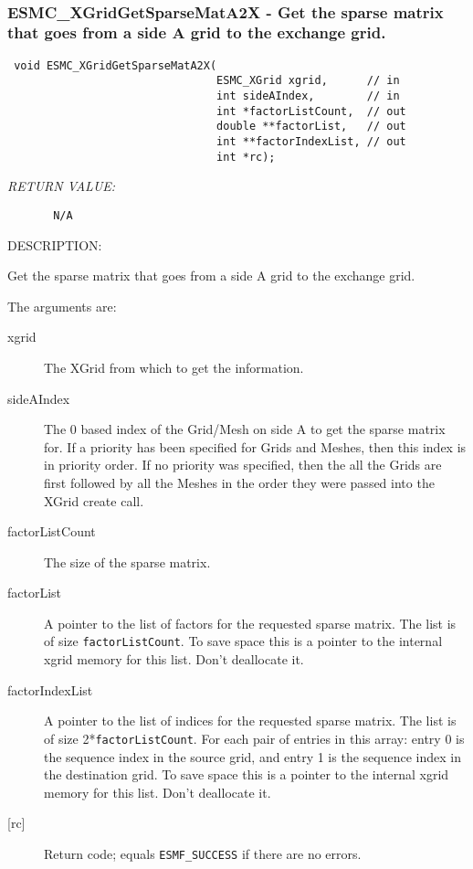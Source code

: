 \mbox{}\hrulefill\ 
 
\subsubsection [ESMC\_XGridGetSparseMatA2X] {ESMC\_XGridGetSparseMatA2X - Get the sparse matrix that goes from a side A grid to the exchange grid.}


 
  
\begin{verbatim} void ESMC_XGridGetSparseMatA2X(
                                ESMC_XGrid xgrid,      // in
                                int sideAIndex,        // in
                                int *factorListCount,  // out
                                double **factorList,   // out
                                int **factorIndexList, // out
                                int *rc);
 \end{verbatim}{\em RETURN VALUE:}
\begin{verbatim}       N/A\end{verbatim}
{\sf DESCRIPTION:\\ }


   
      Get the sparse matrix that goes from a side A grid to the exchange grid.
  
    The arguments are:
    \begin{description}
    \item[xgrid]
      The XGrid from which to get the information.
    \item[sideAIndex]
      The 0 based index of the Grid/Mesh on side A to get the sparse matrix for.
      If a priority has been specified for Grids and Meshes, then this index is 
      in priority order. If no priority was specified, then the all the Grids are
      first followed by all the Meshes in the order they were passed into the XGrid 
      create call. 
    \item[factorListCount]
      The size of the sparse matrix.
    \item[factorList]
      A pointer to the list of factors for the requested sparse matrix. 
      The list is of size {\tt factorListCount}. To save space
      this is a pointer to the internal xgrid memory for this list. 
      Don't deallocate it. 
    \item[factorIndexList]
      A pointer to the list of indices for the requested sparse matrix. 
      The list is of size 2*{\tt factorListCount}. For each pair of entries
      in this array: entry 0 is the sequence index in the source grid, and entry 1 is
      the sequence index in the destination grid. To save space
      this is a pointer to the internal xgrid memory for this list. 
      Don't deallocate it. 
    \item[{[rc]}]
      Return code; equals {\tt ESMF\_SUCCESS} if there are no errors.
    \end{description}
   
